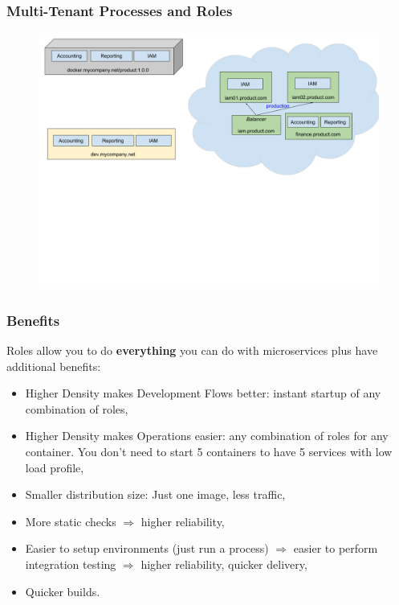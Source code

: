 \documentclass[usenames,dvipsnames]{beamer}
\begin{document}
\begin{frame}
\frametitle{Multi-Tenant Processes and Roles}
\begin{figure}
    \includegraphics[width=\textwidth]{media/role-based-layout.png}
\end{figure}
\end{frame}

\begin{frame}
\frametitle{Benefits}
Roles allow you to do \textbf{everything} you can do with microservices plus have additional benefits\footnotemark[1]:
\begin{itemize}
\item Higher Density makes Development Flows better: instant startup of any combination of roles,
\item Higher Density makes Operations easier: any combination of roles for any container. 
    You don't need to start 5 containers to have 5 services with low load profile,
\item Smaller distribution size: Just one image, less traffic,
\item More static checks $\Rightarrow$ higher reliability,
\item Easier to setup environments (just run a process) $\Rightarrow$ easier to perform integration testing $\Rightarrow$ higher reliability, quicker delivery,
\item Quicker builds.
\end{itemize}
\end{frame}
\end{document}
